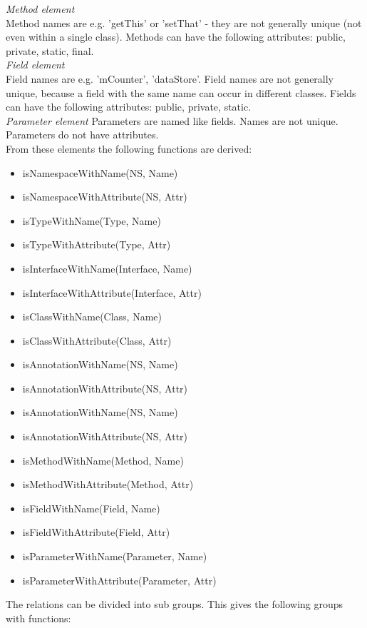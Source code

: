 \emph{Method element}\\
Method names are e.g. 'getThis' or 'setThat' - they are not generally unique (not even within a single class). Methods can have the following attributes: public, private, static, final.\\

\emph{Field element}\\
Field names are e.g. 'mCounter', 'dataStore'. Field names are not generally unique, because a field with the same name can occur in different classes. Fields can have the following attributes: public, private, static.\\

\emph{Parameter element}
Parameters are named like fields. Names are not unique. Parameters do not have attributes.\\ 

From these elements the following functions are derived:
\begin{itemize}
	\item isNamespaceWithName(NS, Name)
  \item isNamespaceWithAttribute(NS, Attr)
  \item isTypeWithName(Type, Name)
  \item isTypeWithAttribute(Type, Attr)
  \item isInterfaceWithName(Interface, Name)
  \item isInterfaceWithAttribute(Interface, Attr)
  \item isClassWithName(Class, Name)
  \item isClassWithAttribute(Class, Attr)
  \item isAnnotationWithName(NS, Name)
  \item isAnnotationWithAttribute(NS, Attr)
  \item isAnnotationWithName(NS, Name)
  \item isAnnotationWithAttribute(NS, Attr)
  \item isMethodWithName(Method, Name)
  \item isMethodWithAttribute(Method, Attr)
  \item isFieldWithName(Field, Name)
  \item isFieldWithAttribute(Field, Attr)
  \item isParameterWithName(Parameter, Name)
  \item isParameterWithAttribute(Parameter, Attr)
\end{itemize}

The relations can be divided into sub groups. This gives the following
groups with functions:

